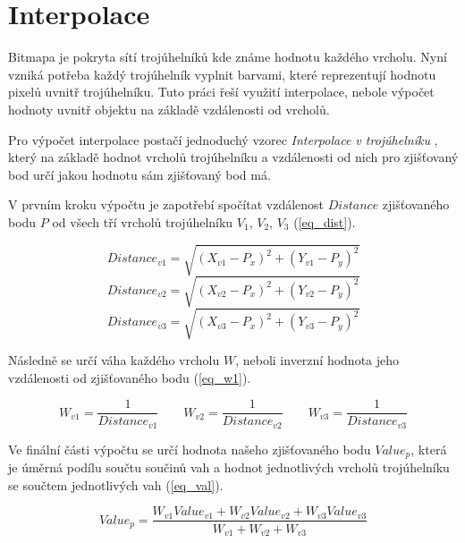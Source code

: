\documentclass[czech,bachelor,dept460,male,csharp,cpdeclaration]{diploma}
\begin{document}
	\section{Interpolace}
	
	Bitmapa je pokryta sítí trojúhelníků kde známe hodnotu každého vrcholu. Nyní vzniká potřeba každý trojúhelník vyplnit barvami, které reprezentují hodnotu pixelů uvnitř trojúhelníku. Tuto práci řeší využití interpolace, nebole výpočet hodnoty uvnitř objektu na základě vzdálenosti od vrcholů.
	
	Pro výpočet interpolace postačí jednoduchý vzorec \emph{Interpolace v trojúhelníku} \cite{interp}, který na základě hodnot vrcholů trojúhelníku a vzdálenosti od nich pro zjišťovaný bod určí jakou hodnotu sám zjišťovaný bod má.
	
	
	V prvním kroku výpočtu je zapotřebí spočítat vzdálenost $Distance$ zjišťovaného bodu $P$ od všech tří vrcholů trojúhelníku $V_1$, $V_2$, $V_3$ (\ref{eq_dist}). 
	
	\begin{displaymath}
		Distance_{v1} =\sqrt{(X_{v1}-P_x)^2+(Y_{v1}-P_y)^2}
	\end{displaymath}
	\begin{displaymath}
		Distance_{v2} =\sqrt{(X_{v2}-P_x)^2+(Y_{v2}-P_y)^2}
	\end{displaymath}
	\begin{equation}\label{eq_dist}
		Distance_{v3} =\sqrt{(X_{v3}-P_x)^2+(Y_{v3}-P_y)^2}
	\end{equation}
	
	Následně se určí váha každého vrcholu $W$, neboli inverzní hodnota jeho vzdálenosti od zjišťovaného bodu (\ref{eq_w1}).
	
	\begin{equation}\label{eq_w1}
		W_{v1} =\frac{1}{Distance_{v1}}
		\quad\mathrm{ }\quad 
		W_{v2} =\frac{1}{Distance_{v2}}
		\quad\mathrm{ }\quad 
		W_{v3} =\frac{1}{Distance_{v3}} 
	\end{equation}
	
	Ve finální části výpočtu se určí hodnota našeho zjišťovaného bodu $Value_p$, která je úměrná podílu součtu součinů vah a hodnot jednotlivých vrcholů trojúhelníku se součtem jednotlivých vah (\ref{eq_val}).
	
	\begin{equation}\label{eq_val}
		Value_p = \frac{W_{v1}Value_{v1} + W_{v2}Value_{v2} + W_{v3}Value_{v3}}{W_{v1} + W_{v2} + W_{v3}}
	\end{equation}
	
\end{document}
